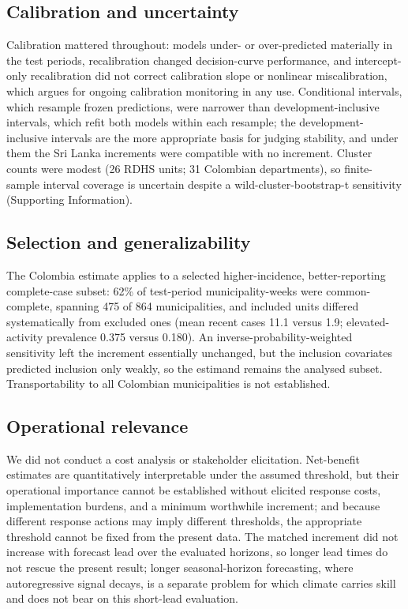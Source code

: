 \documentclass[11pt,a4paper]{article}
\begin{document}
\subsection*{Calibration and uncertainty}
Calibration mattered throughout: models under- or over-predicted materially in the test periods, recalibration changed decision-curve performance, and intercept-only recalibration did not correct calibration slope or nonlinear miscalibration, which argues for ongoing calibration monitoring in any use. Conditional intervals, which resample frozen predictions, were narrower than development-inclusive intervals, which refit both models within each resample; the development-inclusive intervals are the more appropriate basis for judging stability, and under them the Sri Lanka increments were compatible with no increment. Cluster counts were modest (26 RDHS units; 31 Colombian departments), so finite-sample interval coverage is uncertain despite a wild-cluster-bootstrap-t sensitivity (Supporting Information).

\subsection*{Selection and generalizability}
The Colombia estimate applies to a selected higher-incidence, better-reporting complete-case subset: 62\% of test-period municipality-weeks were common-complete, spanning 475 of 864 municipalities, and included units differed systematically from excluded ones (mean recent cases 11.1 versus 1.9; elevated-activity prevalence 0.375 versus 0.180). An inverse-probability-weighted sensitivity left the increment essentially unchanged, but the inclusion covariates predicted inclusion only weakly, so the estimand remains the analysed subset. Transportability to all Colombian municipalities is not established.

\subsection*{Operational relevance}
We did not conduct a cost analysis or stakeholder elicitation. Net-benefit estimates are quantitatively interpretable under the assumed threshold, but their operational importance cannot be established without elicited response costs, implementation burdens, and a minimum worthwhile increment; and because different response actions may imply different thresholds, the appropriate threshold cannot be fixed from the present data. The matched increment did not increase with forecast lead over the evaluated horizons, so longer lead times do not rescue the present result; longer seasonal-horizon forecasting, where autoregressive signal decays, is a separate problem for which climate carries skill~\cite{Beal2025,ColonGonzalez2021,Campbell2026} and does not bear on this short-lead evaluation.
\end{document}
